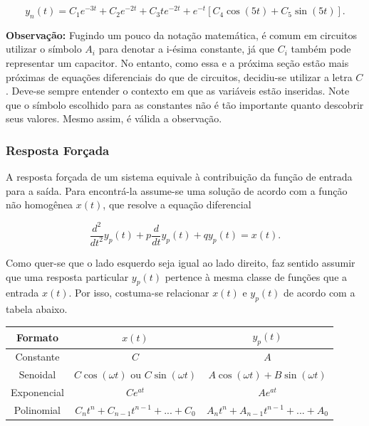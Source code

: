 \documentclass{article}
\numberwithin{equation}{section}
\let\dfr\dfrac
\begin{document}
\begin{equation*}
    y_n(t) = C_1e^{-3t} + C_2e^{-2t}+ C_3te^{-2t} + e^{-t}[C_4\cos(5t) + C_5\sin(5t)].
\end{equation*}

\textbf{Observação:} Fugindo um pouco da notação matemática, é comum em circuitos utilizar o símbolo $A_i$ para denotar a i-ésima constante, já que $C_i$ também pode representar um capacitor. No entanto, como essa e a próxima seção estão mais próximas de equações diferenciais do que de circuitos, decidiu-se utilizar a letra $C$. Deve-se sempre entender o contexto em que as variáveis estão inseridas. Note que o símbolo escolhido para as constantes não é tão importante quanto descobrir seus valores. Mesmo assim, é válida a observação.

\subsubsection{Resposta Forçada}
\label{subsubsec:forçada}
A resposta forçada de um sistema equivale à contribuição da função de entrada para a saída. Para encontrá-la assume-se uma solução de acordo com a função não homogênea $x(t)$, que resolve a equação diferencial

\begin{equation*}
    \dfr{d^2}{dt^2}y_p(t)+p\frac{d}{dt}y_p(t)+qy_p(t)=x(t).
\end{equation*}

Como quer-se que o lado esquerdo seja igual ao lado direito, faz sentido assumir que uma resposta particular $y_p(t)$ pertence à mesma classe de funções que a entrada $x(t)$. Por isso, costuma-se relacionar $x(t)$ e $y_{p}(t)$ de acordo com a tabela abaixo.
\begin{center}
        \begin{tabular}{|c|c|c|} \hline
        Formato & $x(t)$ & $y_{p}(t)$ \\ \hline
        Constante & $C$ & $A$ \\ \hline
        Senoidal & $C\cos(\omega t)$ ou $C\sin(\omega t)$ & $A\cos(\omega t) + B\sin(\omega t)$ \\ \hline
        Exponencial & $Ce^{at}$ & $Ae^{at}$ \\ \hline
        Polinomial & $C_{n}t^{n} + C_{n-1}t^{n-1} + ... + C_{0}$ & $A_{n}t^{n} + A_{n-1}t^{n-1} + ... + A_{0}$ \\ \hline
    \end{tabular}
\end{center}
\end{document}

